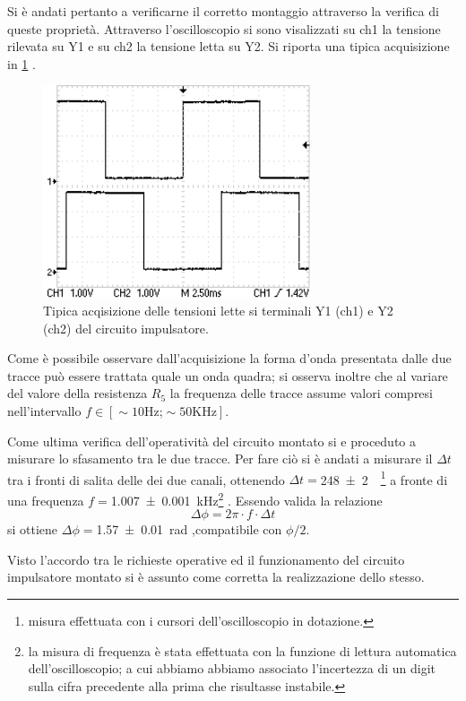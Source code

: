Si è andati pertanto a verificarne il corretto montaggio attraverso la verifica di queste proprietà.
Attraverso l'oscilloscopio si sono visalizzati su ch1 la tensione rilevata su Y1 e su  ch2 la tensione letta su Y2. Si riporta una tipica acquisizione in 
\figurename{ \ref{f:oscil} }.
\begin{figure}[htb]
	\includegraphics[scale=0.50]{../Figs-Tabs/ondaquadra_esempio.png}
	\caption{Tipica acqisizione delle tensioni lette si terminali Y1 (ch1) e Y2 (ch2) del circuito impulsatore.}
	\label{f:oscil}
\end{figure}

Come è possibile osservare dall'acquisizione la forma d'onda presentata dalle due tracce può essere trattata quale un onda quadra; si osserva inoltre che al variare del valore della resistenza $R_{5}$ la frequenza delle tracce assume valori compresi nell'intervallo $f\in [\sim 10 \text{Hz;} \sim 50 \text{KHz}]$.

Come ultima verifica dell'operatività del circuito montato si e proceduto a misurare lo sfasamento tra le due tracce.
Per fare ciò si è andati a misurare il $\Delta t$ tra i fronti di salita delle dei due canali, ottenendo $\Delta t=$\SI{248 \pm 2}{\mu \sec}\footnote{misura effettuata con i cursori dell'oscilloscopio in dotazione.} a fronte di una frequenza
$f=$\SI{1.007 \pm 0.001}{\kilo \hertz}\footnote{la misura di frequenza è stata effettuata con la funzione di lettura automatica dell'oscilloscopio; a cui abbiamo abbiamo associato l'incertezza di un digit sulla cifra precedente alla prima che risultasse instabile. } .
Essendo valida la relazione \begin{equation}
\Delta \phi = 2 \pi \cdot f \cdot \Delta t
\end{equation}\label{eq:sfas}
si ottiene $\Delta \phi=$\SI{1.57 \pm 0.01 }{\radian} ,compatibile con $\phi/2$.

Visto l'accordo tra le richieste operative ed il funzionamento del circuito impulsatore montato 
si è assunto  come  corretta la realizzazione dello stesso.


